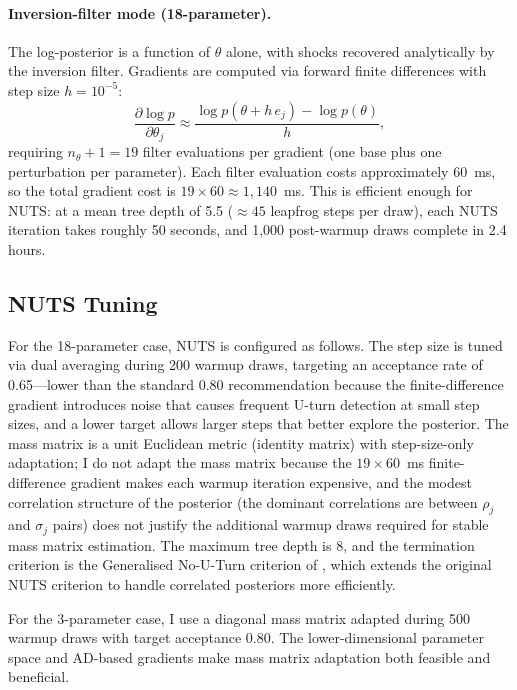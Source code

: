 \documentclass[12pt]{article}
\theoremstyle{plain}
\theoremstyle{definition}
\theoremstyle{remark}
\begin{document}
\paragraph{Inversion-filter mode (18-parameter).} The log-posterior is a function of $\theta$ alone, with shocks recovered analytically by the inversion filter. Gradients are computed via forward finite differences with step size $h = 10^{-5}$:
\begin{equation}
\frac{\partial \log p}{\partial \theta_j} \approx \frac{\log p(\theta + h\, e_j) - \log p(\theta)}{h},
\end{equation}
requiring $n_\theta + 1 = 19$ filter evaluations per gradient (one base plus one perturbation per parameter). Each filter evaluation costs approximately 60~ms, so the total gradient cost is $19 \times 60 \approx 1{,}140$~ms. This is efficient enough for NUTS: at a mean tree depth of 5.5 ($\approx 45$ leapfrog steps per draw), each NUTS iteration takes roughly 50 seconds, and 1,000 post-warmup draws complete in 2.4 hours.


\subsection{NUTS Tuning}
\label{app:nuts_tuning}

For the 18-parameter case, NUTS is configured as follows. The step size is tuned via dual averaging during 200 warmup draws, targeting an acceptance rate of 0.65---lower than the standard 0.80 recommendation because the finite-difference gradient introduces noise that causes frequent U-turn detection at small step sizes, and a lower target allows larger steps that better explore the posterior. The mass matrix is a unit Euclidean metric (identity matrix) with step-size-only adaptation; I do not adapt the mass matrix because the $19 \times 60$~ms finite-difference gradient makes each warmup iteration expensive, and the modest correlation structure of the posterior (the dominant correlations are between $\rho_j$ and $\sigma_j$ pairs) does not justify the additional warmup draws required for stable mass matrix estimation. The maximum tree depth is 8, and the termination criterion is the Generalised No-U-Turn criterion of \citet{betancourt2017conceptual}, which extends the original NUTS criterion to handle correlated posteriors more efficiently.

For the 3-parameter case, I use a diagonal mass matrix adapted during 500 warmup draws with target acceptance 0.80. The lower-dimensional parameter space and AD-based gradients make mass matrix adaptation both feasible and beneficial.
\end{document}
